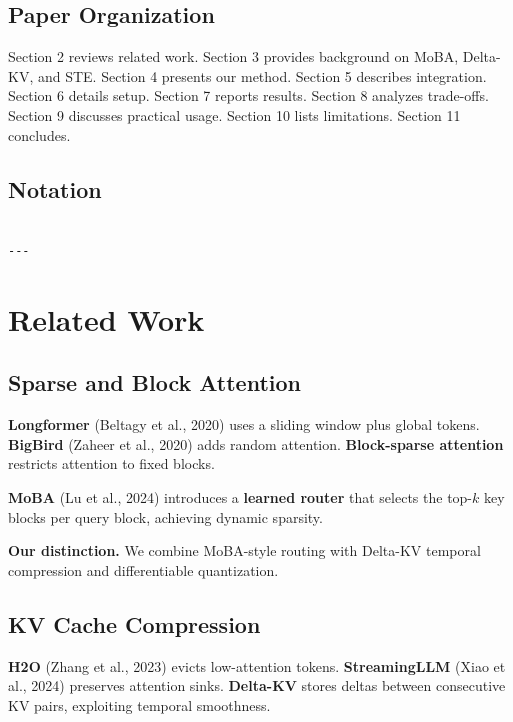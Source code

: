 \subsection{Paper Organization}

Section 2 reviews related work. Section 3 provides background on MoBA, 
Delta-KV, and STE. Section 4 presents our method. Section 5 describes 
integration. Section 6 details setup. Section 7 reports results. Section 8 
analyzes trade-offs. Section 9 discusses practical usage. Section 10 lists 
limitations. Section 11 concludes.



\subsection{Notation}

\begin{lstlisting}

---
\end{lstlisting}

\section{Related Work}

\subsection{Sparse and Block Attention}

\textbf{Longformer} (Beltagy et al., 2020) uses a sliding window plus global 
tokens. \textbf{BigBird} (Zaheer et al., 2020) adds random attention. 
\textbf{Block-sparse attention} restricts attention to fixed blocks.

\textbf{MoBA} (Lu et al., 2024) introduces a \textbf{learned router} that selects 
the top-$k$ key blocks per query block, achieving dynamic sparsity.

\textbf{Our distinction.} We combine MoBA-style routing with Delta-KV temporal 
compression and differentiable quantization.

\subsection{KV Cache Compression}

\textbf{H2O} (Zhang et al., 2023) evicts low-attention tokens. \textbf{StreamingLLM} 
(Xiao et al., 2024) preserves attention sinks. \textbf{Delta-KV} stores deltas 
between consecutive KV pairs, exploiting temporal smoothness.

